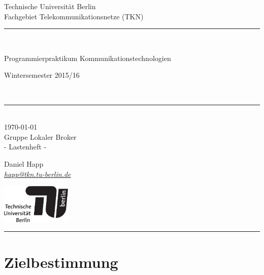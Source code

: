 \documentclass[fontsize=11pt,a4paper]{scrartcl}
\newcommand{\HRule}{\rule{\linewidth}{0.2mm}}
\begin{document}
\setlength{\parindent}{0mm}

\begin{titlepage}

\textsf{\large Technische Universität Berlin\\
Fachgebiet Telekommunikationsnetze (TKN)\\[0.5cm]}

\HRule \\[0.4cm]
\begin{minipage}{0.49\textwidth}
\begin{flushleft}
\textsf{Programmierpraktikum Kommunikationstechnologien}
\end{flushleft}
\end{minipage}
\begin{minipage}{0.49\textwidth}
\begin{flushright}
\textsf{Wintersemester 2015/16}
\end{flushright}
\end{minipage}
\\[0.4cm]
\HRule \\[1.0cm]

\today \\[0.5cm]

\textsf{{ \huge Gruppe Lokaler Broker \\[0.5cm] - Lastenheft - } \\[0.5cm]}

Daniel Happ \\
\textit{{\small \href{mailto:happ@tkn.tu-berlin.de?subject=Programmierpraktikum\%20Kommunikationstechnologien}{happ@tkn.tu-berlin.de}}} \\

\begin{center}
\vfill
\includegraphics[width=0.25\textwidth]{./images/TU_Logo_lang_1c_schwarz} \\[1.0cm]
\HRule
\end{center}

\end{titlepage}

\setlength{\parindent}{4mm}

\section{Zielbestimmung}
\end{document}
